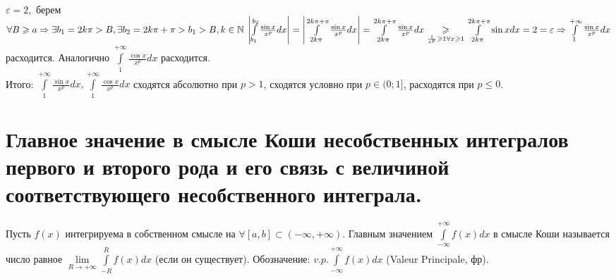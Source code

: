 \documentclass[../main.tex]{subfiles}
\begin{document}
\\$\varepsilon=2,$ берем $\forall B\geqslant a\Rightarrow \exists b_{1}=2k\pi>B,\exists b_{2} = 2k\pi+\pi > b_{1}>B, k\in\mathbb{N} \; \left| \int\limits_{b_{1}}^{b_{2}}\frac{\sin{x}}{x^{p}}dx\right| = \left| \int\limits_{2k\pi}^{2k\pi+\pi} \frac{\sin{x}}{x^{p}}dx\right|=\int\limits_{2k\pi}^{2k\pi+\pi}\frac{\sin{x}}{x^{p}}dx\underset{\frac{1}{x^{p}}\geqslant 1 \forall x\geqslant 1}{\geqslant}  \int\limits_{2k\pi}^{2k\pi+\pi}\sin{x}dx=2=\varepsilon \Rightarrow \int\limits_{1}^{+\infty}\frac{\sin{x}}{x^{p}}dx  $ расходится. Аналогично $\int\limits_{1}^{+\infty}\frac{\cos{x}}{x^{p}}dx$ расходится.
\\Итого: $\int\limits_{1}^{+\infty}\frac{\sin{x}}{x^{p}}dx, \int\limits_{1}^{+\infty}\frac{\cos{x}}{x^{p}} dx $ сходятся абсолютно при $p>1$, сходятся условно при $p\in(0;1]$, расходятся при $p\leqslant 0$.  

\section{Главное значение в смысле Коши несобственных интегралов первого и второго рода и его связь с величиной соответствующего несобственного интеграла.}
\begin{definition}
Пусть $f(x)$ интегрируема в собственном смысле на $\forall[a,b]\subset (-\infty,+\infty)$. Главным значением $\int\limits_{-\infty }^{+\infty}f(x)dx $  в смысле Коши называется число равное $\lim\limits_{R\to +\infty}\int\limits_{-R}^{R} f(x)dx $ (если он существует). Обозначение: $v.p.\int\limits_{-\infty    }^{+\infty  } f(x)dx$ (Valeur Principale, фр).
\end{definition}
\end{document}

